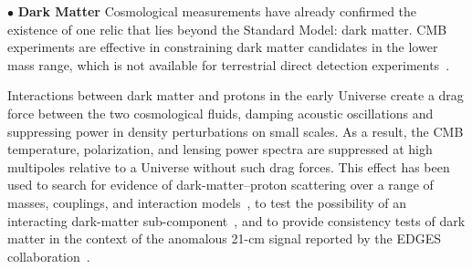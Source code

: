 \documentclass[PICOAPC.tex]{subfiles}
\begin{document}


\noindent$\bullet$ {\bf Dark Matter} \hspace{0.1in} Cosmological measurements have already confirmed the existence of one relic that lies beyond the Standard Model: dark matter. \ac{CMB} experiments are effective in constraining dark matter candidates in the lower mass range, which is not available for terrestrial direct detection experiments~\citep{Slatyer2009,Galli2009,Huetsi2009,Huetsi2011,Madhavacheril:2013cna,Green:2018pmd}. 

Interactions between dark matter and protons in the early Universe create a drag force between the two cosmological fluids, damping acoustic oscillations and suppressing power in density perturbations on small scales. As a result, the CMB temperature, polarization, and lensing power spectra are suppressed at high multipoles relative to a Universe without such drag forces.  This effect has been used to search for evidence of dark-matter--proton scattering over a range of masses, couplings, and interaction models~\citep{2002astro.ph..2496C, 2004PhRvD..70h3501S, Dvorkin:2013cea, 2018PhRvL.121h1301G,2018arXiv180108609B, 2018PhRvD..97j3530X, 2018arXiv180800001B, 2018PhRvD..98b3013S}, to test the possibility of an interacting dark-matter sub-component~\citep{2018arXiv180800001B}, and to provide consistency tests of dark matter in the context of the anomalous 21-cm signal reported by the EDGES collaboration~\citep{2018Natur.555...71B,2018Natur.555...67B,2018arXiv180800001B,2018arXiv180711482K}.
 
\end{document}

